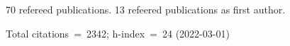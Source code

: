 70 refereed publications. 13 refeered publications as first author.

Total citations~=~2342; h-index~=~24 (2022-03-01)